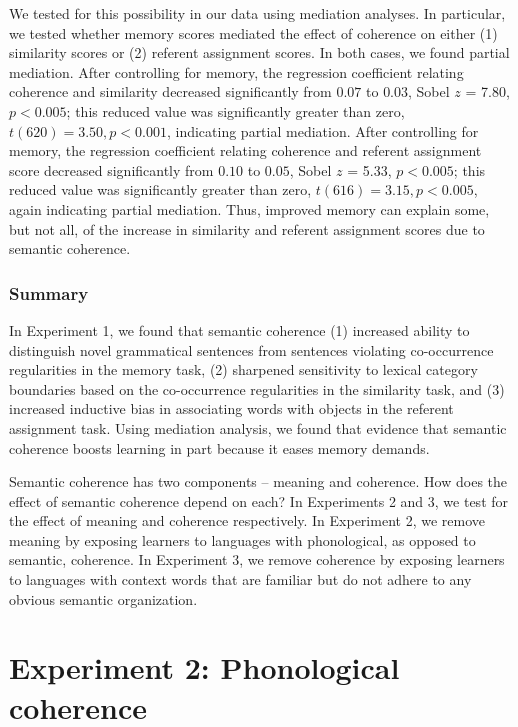 \documentclass[man,floatsintext]{apa6}
\begin{document}
We tested for this possibility in our data using mediation
analyses. In particular, we tested whether memory scores mediated the
effect of coherence on either (1) similarity scores or (2) referent
assignment scores. In both cases, we found partial mediation. After
controlling for memory, the regression coefficient relating coherence
and similarity decreased significantly from $0.07$ to $0.03$, Sobel
$z$ = 7.80, $p < 0.005$; this reduced value was significantly greater
than zero, $t(620) = 3.50, p < 0.001$, indicating partial
mediation. After controlling for memory, the regression coefficient
relating coherence and referent assignment score decreased
significantly from $0.10$ to $0.05$, Sobel $z$ = 5.33, $p < 0.005$;
this reduced value was significantly greater than zero, $t(616) =
3.15, p < 0.005$, again indicating partial mediation. Thus, improved
memory can explain some, but not all, of the increase in similarity
and referent assignment scores due to semantic coherence.

\subsubsection{Summary}

In Experiment 1, we found that semantic coherence (1) increased
ability to distinguish novel grammatical sentences from sentences
violating co-occurrence regularities in the memory task, (2) sharpened
sensitivity to lexical category boundaries based on the co-occurrence
regularities in the similarity task, and (3) increased inductive bias
in associating words with objects in the referent assignment
task. Using mediation analysis, we found that evidence that semantic
coherence boosts learning in part because it eases memory demands.

Semantic coherence has two components -- meaning and coherence. How
does the effect of semantic coherence depend on each? In Experiments 2
and 3, we test for the effect of meaning and coherence
respectively. In Experiment 2, we remove meaning by exposing learners
to languages with phonological, as opposed to semantic, coherence. In
Experiment 3, we remove coherence by exposing learners to languages
with context words that are familiar but do not adhere to any obvious
semantic organization.

\section{Experiment 2: Phonological coherence}
\end{document}
